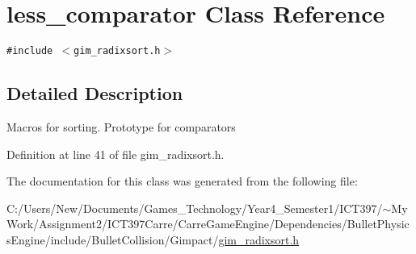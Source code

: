 \hypertarget{classless__comparator}{
\section{less\_\-comparator Class Reference}
\label{classless__comparator}
}
{\tt \#include $<$gim\_\-radixsort.h$>$}



\subsection{Detailed Description}
Macros for sorting. Prototype for comparators 

Definition at line 41 of file gim\_\-radixsort.h.

The documentation for this class was generated from the following file:\begin{CompactItemize}
\item 
C:/Users/New/Documents/Games\_\-Technology/Year4\_\-Semester1/ICT397/$\sim$My Work/Assignment2/ICT397Carre/CarreGameEngine/Dependencies/BulletPhysicsEngine/include/BulletCollision/Gimpact/\hyperlink{gim__radixsort_8h}{gim\_\-radixsort.h}\end{CompactItemize}
